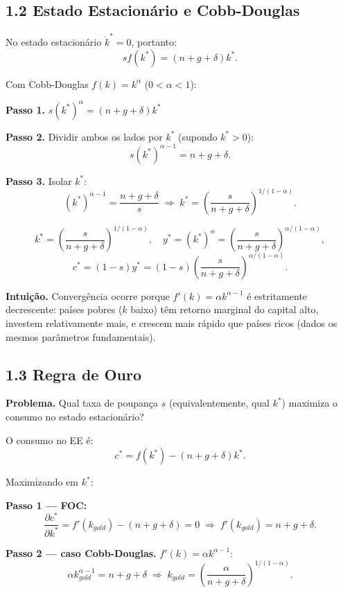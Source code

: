 \documentclass[12pt, a4paper]{article}
\begin{document}
\subsection*{1.2 Estado Estacionário e Cobb-Douglas}

No estado estacionário $\dot{k}^* = 0$, portanto:
\[
sf(k^*) = (n+g+\delta)k^*.
\]

Com Cobb-Douglas $f(k) = k^\alpha$ ($0 < \alpha < 1$):

\textbf{Passo 1.} $s(k^*)^\alpha = (n+g+\delta)k^*$

\textbf{Passo 2.} Dividir ambos os lados por $k^*$ (supondo $k^*>0$):
\[
s(k^*)^{\alpha-1} = n+g+\delta.
\]

\textbf{Passo 3.} Isolar $k^*$:
\[
(k^*)^{\alpha-1} = \frac{n+g+\delta}{s} \;\Longrightarrow\; k^* = \left(\frac{s}{n+g+\delta}\right)^{1/(1-\alpha)}.
\]

\begin{resultbox}[title={Estado Estacionário de Solow --- Cobb-Douglas}]
\[
k^* = \left(\frac{s}{n+g+\delta}\right)^{\!1/(1-\alpha)}, \quad
y^* = (k^*)^\alpha = \left(\frac{s}{n+g+\delta}\right)^{\!\alpha/(1-\alpha)},
\]
\[
c^* = (1-s)y^* = (1-s)\left(\frac{s}{n+g+\delta}\right)^{\!\alpha/(1-\alpha)}.
\]
\end{resultbox}

\textbf{Intuição.} Convergência ocorre porque $f'(k) = \alpha k^{\alpha-1}$ é estritamente decrescente: países pobres ($k$ baixo) têm retorno marginal do capital alto, investem relativamente mais, e crescem mais rápido que países ricos (dados os mesmos parâmetros fundamentais).

\subsection*{1.3 Regra de Ouro}

\textbf{Problema.} Qual taxa de poupança $s$ (equivalentemente, qual $k^*$) maximiza o consumo no estado estacionário?

O consumo no EE é:
\[
c^* = f(k^*) - (n+g+\delta)k^*.
\]

Maximizando em $k^*$:

\textbf{Passo 1 --- FOC:}
\[
\frac{\partial c^*}{\partial k^*} = f'(k_{gold}) - (n+g+\delta) = 0 \;\Longrightarrow\; f'(k_{gold}) = n+g+\delta.
\]

\textbf{Passo 2 --- caso Cobb-Douglas.} $f'(k) = \alpha k^{\alpha-1}$:
\[
\alpha k_{gold}^{\alpha-1} = n+g+\delta \;\Longrightarrow\; k_{gold} = \left(\frac{\alpha}{n+g+\delta}\right)^{1/(1-\alpha)}.
\]
\end{document}

